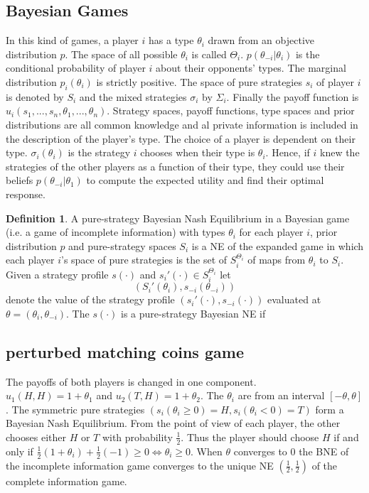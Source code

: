 \documentclass[a4paper, 12pt]{article}
\theoremstyle{plain}
\theoremstyle{definition}
\newtheorem{definition}[theorem]{Definition} %
\theoremstyle{lemma}
\theoremstyle{remark}
\theoremstyle{corollary}
\theoremstyle{example}
\begin{document}
	\subsection{Bayesian Games}
	In this kind of games, a player $i$ has a type $\theta_i$ drawn from an objective distribution $p$. The space of all possible $\theta_i$ is called $\Theta_i$. $p(\theta_{-i}|\theta_i)$ is the conditional probability of player $i$ about their opponents' types. The marginal distribution $p_i(\theta_i)$ is strictly positive. The space of pure strategies $s_i$ of player $i$ is denoted by $S_i$ and the mixed strategies $\sigma_i$ by $\Sigma_i$. Finally the payoff function is $u_i(s_1,...,s_n,\theta_1,...,\theta_n)$. Strategy spaces, payoff functions, type spaces and prior distributions are all common knowledge and al private information is included in the description of the player's type. The choice of a player is dependent on their type. $\sigma_i(\theta_i)$ is the strategy $i$ chooses when their type is $\theta_i$. Hence, if $i$ knew the strategies of the other players as a function of their type, they could use their beliefs $p(\theta_{-i}|\theta_1)$ to compute the expected utility and find their optimal response.
	\begin{definition}
		A pure-strategy Bayesian Nash Equilibrium in a Bayesian game (i.e. a game of incomplete information) with types $\theta_i$ for each player $i$, prior distribution $p$ and pure-strategy spaces $S_i$ is a NE of the expanded game in which each player $i$'s space of pure strategies is the set of $S_i^{\Theta_i}$ of maps from $\theta_i$ to $S_i$.\\
		Given a strategy profile $s(\cdot)$ and $s_i'(\cdot)\in S_i^{\Theta_i}$ let \[(S_i'(\theta_i),s_{-i}(\theta_{-i}))\] denote the value of the strategy profile $(s_i'(\cdot),s_{-i}(\cdot))$ evaluated at $\theta = (\theta_i, \theta_{-i})$. The $s(\cdot)$ is a pure-strategy Bayesian NE if 
	\end{definition}
	\subsection{perturbed matching coins game}
	The payoffs of both players is changed in one component.\\$u_1(H,H) = 1+\theta_1$ and $u_2(T,H) = 1+\theta_2$. The $\theta_i$ are from an interval $[-\theta,\theta]$. The symmetric pure strategies $(s_i(\theta_i \geq 0) = H, s_i(\theta_i < 0) = T)$ form a Bayesian Nash Equilibrium. From the point of view of each player, the other chooses either $H$ or $T$ with probability $\frac{1}{2}$. Thus the player should choose $H$ if and only if $\frac{1}{2}(1+\theta_i) + \frac{1}{2}(-1) \geq 0 \Leftrightarrow \theta_i \geq 0$. When $\theta$ converges to $0$ the BNE of the incomplete information game converges to the unique NE $(\frac{1}{2},\frac{1}{2})$ of the complete information game.
\end{document}

